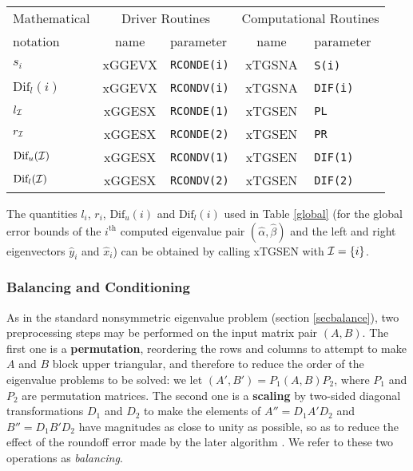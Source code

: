 \begin{center}
\begin{tabular}{|l|c|l|c|l|} \hline
Mathematical & \multicolumn{2}{c|}{Driver Routines} &
               \multicolumn{2}{c|}{Computational Routines} \\
notation     & name & parameter    & name &  parameter  \\ \hline
$s_i$             & xGGEVX & {\tt RCONDE(i)} & xTGSNA & {\tt S(i)}~~~ \\
$\mbox{Dif}_l(i)$ & xGGEVX & {\tt RCONDV(i)} & xTGSNA & {\tt DIF(i)} \\
$l_{\cal I}$ & xGGESX & {\tt RCONDE(1)} & xTGSEN & {\tt PL}  \\
$r_{\cal I}$ & xGGESX & {\tt RCONDE(2)} & xTGSEN & {\tt PR} \\
$\mbox{Dif}_u({\cal I})$ & xGGESX & {\tt RCONDV(1)} & xTGSEN & {\tt DIF(1)} \\
$\mbox{Dif}_l({\cal I})$ & xGGESX & {\tt RCONDV(2)} & xTGSEN & {\tt DIF(2)} \\
\hline
\end{tabular}
\end{center}

The quantities $l_i$, $r_i$, $\mbox{Dif}_u(i)$ and $\mbox{Dif}_l(i)$ used in
Table \ref{global} (for the global error bounds of
the $i^{\mbox{th}}$ computed eigenvalue pair $(\hat{\alpha},\hat{\beta})$
and the left and right eigenvectors $\hat{y}_i$ and $\hat{x}_i$)
can be obtained by calling xTGSEN with ${\cal I} = \{ i \}$.

\subsubsection{Balancing and Conditioning}\label{GENP32}

As in the standard nonsymmetric eigenvalue problem (section \ref{secbalance}),
two preprocessing steps
may be performed on the input matrix pair $(A, B)$.
The first one is a {\bf permutation}, reordering the rows and columns
to attempt to make $A$ and $B$ block upper triangular, and
therefore to reduce the order of the eigenvalue problems to be solved:
we let $(A',B') = P_1 (A, B) P_2$, where $P_1$ and $P_2$ are
permutation matrices.
The second one is a {\bf scaling}
by two-sided diagonal transformations $D_1$
and $D_2$ to make the elements of $A''= D_1 A' D_2$ and $B'' = D_1 B' D_2$
have magnitudes as close to unity as possible, so as to reduce the effect
of the roundoff error made by the later algorithm \cite{ward81}.
We refer to these two operations as {\em balancing}.

